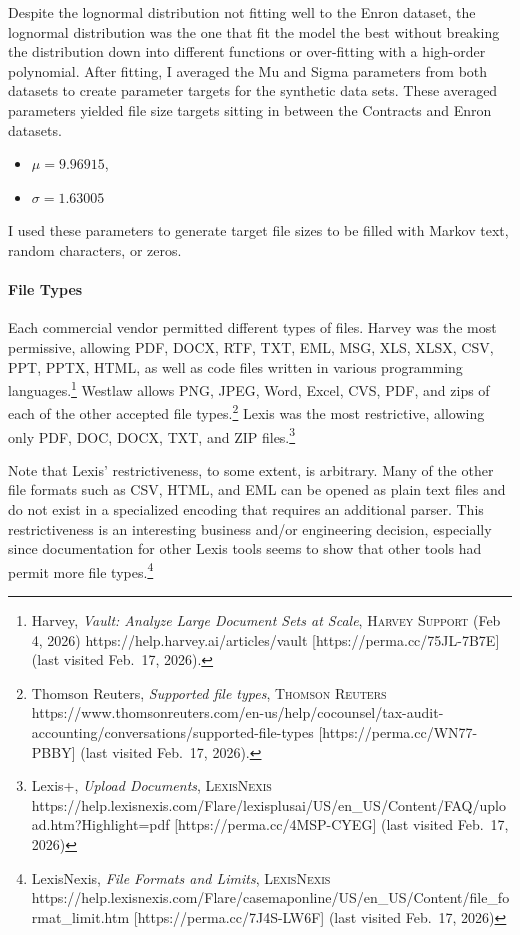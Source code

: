 \documentclass[
]{article}
\providecommand{\tightlist}{%
  \setlength{\itemsep}{0pt}\setlength{\parskip}{0pt}}
\begin{document}
Despite the lognormal distribution not fitting well to the Enron
dataset, the lognormal distribution was the one that fit the model the
best without breaking the distribution down into different functions or
over-fitting with a high-order polynomial. After fitting, I averaged the
Mu and Sigma parameters from both datasets to create parameter targets
for the synthetic data sets. These averaged parameters yielded file size
targets sitting in between the Contracts and Enron datasets.

\begin{itemize}
\tightlist
\item
  \(\mu = 9.96915\),
\item
  \(\sigma = 1.63005\)
\end{itemize}

I used these parameters to generate target file sizes to be filled with
Markov text, random characters, or zeros.

\paragraph{File Types}\label{file-types}

Each commercial vendor permitted different types of files. Harvey was
the most permissive, allowing PDF, DOCX, RTF, TXT, EML, MSG, XLS, XLSX,
CSV, PPT, PPTX, HTML, as well as code files written in various
programming languages.\footnote{Harvey, \emph{Vault: Analyze Large
  Document Sets at Scale}, \textsc{Harvey Support} (Feb 4, 2026)
  https://help.harvey.ai/articles/vault {[}https://perma.cc/75JL-7B7E{]}
  (last visited Feb.~17, 2026).} Westlaw allows PNG, JPEG, Word, Excel,
CVS, PDF, and zips of each of the other accepted file types.\footnote{Thomson
  Reuters, \emph{Supported file types}, \textsc{Thomson Reuters}
  https://www.thomsonreuters.com/en-us/help/cocounsel/tax-audit-accounting/conversations/supported-file-types
  {[}https://perma.cc/WN77-PBBY{]} (last visited Feb.~17, 2026).} Lexis
was the most restrictive, allowing only PDF, DOC, DOCX, TXT, and ZIP
files.\footnote{Lexis+, \emph{Upload Documents}, \textsc{LexisNexis}
  https://help.lexisnexis.com/Flare/lexisplusai/US/en\_US/Content/FAQ/upload.htm?Highlight=pdf
  {[}https://perma.cc/4MSP-CYEG{]} (last visited Feb.~17, 2026)}

Note that Lexis' restrictiveness, to some extent, is arbitrary. Many of
the other file formats such as CSV, HTML, and EML can be opened as plain
text files and do not exist in a specialized encoding that requires an
additional parser. This restrictiveness is an interesting business
and/or engineering decision, especially since documentation for other
Lexis tools seems to show that other tools had permit more file
types.\footnote{LexisNexis, \emph{File Formats and Limits},
  \textsc{LexisNexis}
  https://help.lexisnexis.com/Flare/casemaponline/US/en\_US/Content/file\_format\_limit.htm
  {[}https://perma.cc/7J4S-LW6F{]} (last visited Feb.~17, 2026)}
\end{document}
